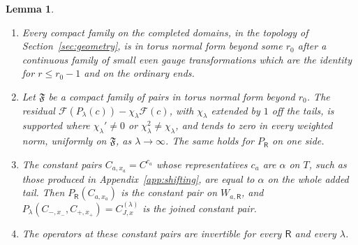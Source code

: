 \documentclass[11pt]{amsart}
\newtheorem{lemma}[theorem]{Lemma}
\theoremstyle{definition}
\theoremstyle{remark}
\theoremstyle{plain}
\numberwithin{equation}{section}
\begin{document}
\begin{lemma}\label{lem:split-preglue}
\begin{enumerate}[label=(\roman*)]
\item Every compact family on the completed domains, in the topology of
Section~\ref{sec:geometry}, is in torus normal form beyond some $r_0$
after a continuous family of small even gauge transformations which
are the identity for $r\le r_0-1$ and on the ordinary ends.
\item Let $\mathfrak F$ be a compact family of pairs in torus normal form
beyond $r_0$. The residual $\mathcal F(P_\lambda(c))-\chi_\lambda\mathcal F(c)$,
with $\chi_\lambda$ extended by $1$ off the tails, is supported
where $\chi_\lambda'\neq0$ or $\chi_\lambda^2\neq\chi_\lambda$, and tends to
zero in every weighted norm, uniformly on $\mathfrak F$, as
$\lambda\to\infty$. The same holds for $P_{\mathsf R}$ on one side.
\item The constant pairs $C_{a,x_a}=C^{c_a}$ whose representatives $c_a$
are $\alpha$ on $T$, such as those produced in Appendix~\ref{app:shifting},
are equal to $\alpha$ on the whole added tail. Then
$P_{\mathsf R}(C_{a,x_a})$ is the constant pair
on $W_{a,\mathsf R}$, and
$P_\lambda(C_{-,x_-},C_{+,x_+})=C^{(\lambda)}_{J,x}$ is the joined constant
pair.
\item The operators at these constant pairs are invertible for every
$\mathsf R$ and every $\lambda$.
\end{enumerate}
\end{lemma}
\end{document}
